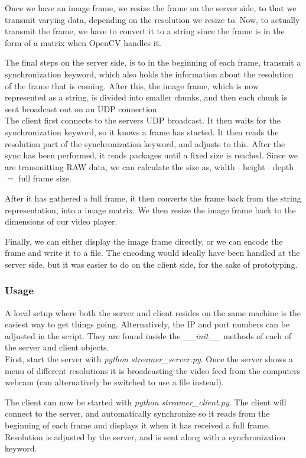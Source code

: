 Once we have an image frame, we resize the frame on the server side, to that we transmit varying data, depending on the resolution we resize to. Now, to actually transmit the frame, we have to convert it to a string since the frame is in the form of a matrix when OpenCV handles it.

The final steps on the server side, is to in the beginning of each frame, transmit a synchronization keyword, which also holds the information about the resolution of the frame that is coming. After this, the image frame, which is now represented as a string, is divided into smaller chunks, and then each chunk is sent broadcast out on an UDP connection.\\

The client first connects to the servers UDP broadcast. It then waits for the synchronization keyword, so it knows a frame has started. It then reads the resolution part of the synchronization keyword, and adjusts to this. After the sync has been performed, it reads packages until a fixed size is reached. Since we are transmitting RAW data, we can calculate the size as, width $\cdot$ height $\cdot$ depth $=$ full frame size. 

After it has gathered a full frame, it then converts the frame back from the string representation, into a image matrix. We then resize the image frame back to the dimensions of our video player.

Finally, we can either display the image frame directly, or we can encode the frame and write it to a file. The encoding would ideally have been handled at the server side, but it was easier to do on the client side, for the sake of prototyping.


\subsubsection{Usage}
A local setup where both the server and client resides on the same machine is the easiest way to get things going. Alternatively, the IP and port numbers can be adjusted in the script. They are found inside the \textit{\_\_init\_\_} methods of each of the server and client objects.\\

First, start the server with \textit{python streamer\_server.py}. Once the server shows a menu of different resolutions it is broadcasting the video feed from the computers webcam (can alternatively be switched to use a file instead). 

The client can now be started with \textit{python streamer\_client.py}. The client will connect to the server, and automatically synchronize so it reads from the beginning of each frame and displays it when it has received a full frame. Resolution is adjusted by the server, and is sent along with a synchronization keyword.\\

